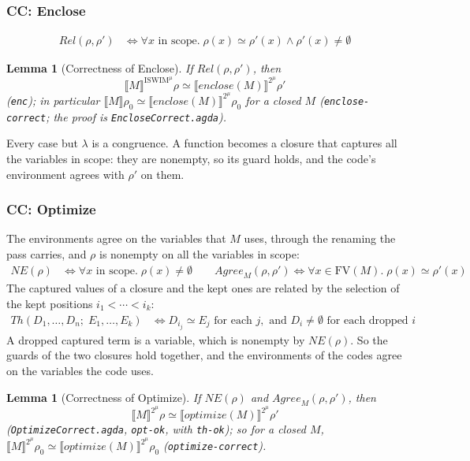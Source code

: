 \documentclass[10pt]{article}
\theoremstyle{acmplain}
\newtheorem{lemma}[theorem]{Lemma}
\newcommand{\SEM}[1]{\llbracket #1 \rrbracket}
\newcommand{\pass}[1]{\mathit{#1}}
\newcommand{\FV}{\mathrm{FV}}
\newcommand{\NE}{\neq\emptyset}
\newcommand{\Ml}[1]{\textrm{#1}^{\mu}}                  %
\begin{document}
\subsubsection{CC: Enclose}

\begin{align*}
  \mathit{Rel}(\rho, \rho') &\iff \forall x \text{ in scope}.\; \rho(x) \simeq \rho'(x) \land \rho'(x) \NE
\end{align*}
\begin{lemma}[Correctness of Enclose]\label{lem:m-den-enclose}
If $\mathit{Rel}(\rho, \rho')$, then
\[ \SEM{M}^{\Ml{ISWIM}}\rho \simeq \SEM{\pass{enclose}(M)}^{\Ml{2}}\rho' \]
(\texttt{enc}); in particular $\SEM{M}\rho_0 \simeq \SEM{\pass{enclose}(M)}^{\Ml{2}}\rho_0$
for a closed $M$ (\texttt{enclose-correct}; the proof is
\texttt{EncloseCorrect.agda}).
\end{lemma}
Every case but $\lambda$ is a congruence. A function becomes a closure
that captures all the variables in scope: they are nonempty, so its guard
holds, and the code's environment agrees with $\rho'$ on them.

\subsubsection{CC: Optimize}

The environments agree on the variables that $M$ uses, through the
renaming the pass carries, and $\rho$ is nonempty on all the variables in
scope:
\begin{align*}
  \mathit{NE}(\rho) &\iff \forall x \text{ in scope}.\; \rho(x) \NE \qquad
  \mathit{Agree}_M(\rho, \rho') \iff \forall x \in \FV(M).\; \rho(x) \simeq \rho'(x)
\end{align*}
The captured values of a closure and the kept ones are related by the
selection of the kept positions $i_1 < \cdots < i_k$:
\begin{align*}
  \mathit{Th}(D_1, \ldots, D_n;\; E_1, \ldots, E_k) &\iff
    D_{i_j} \simeq E_j \text{ for each } j, \text{ and } D_i \NE \text{ for each dropped } i
\end{align*}
A dropped captured term is a variable, which is nonempty by
$\mathit{NE}(\rho)$. So the guards of the two closures hold together, and
the environments of the codes agree on the variables the code uses.
\begin{lemma}[Correctness of Optimize]\label{lem:m-den-optimize}
If $\mathit{NE}(\rho)$ and $\mathit{Agree}_M(\rho, \rho')$, then
\[ \SEM{M}^{\Ml{2}}\rho \simeq \SEM{\pass{optimize}(M)}^{\Ml{2}}\rho' \]
(\texttt{OptimizeCorrect.agda}, \texttt{opt-ok}, with \texttt{th-ok}); so
for a closed $M$, $\SEM{M}^{\Ml{2}}\rho_0 \simeq \SEM{\pass{optimize}(M)}^{\Ml{2}}\rho_0$
(\texttt{optimize-correct}).
\end{lemma}
\end{document}
